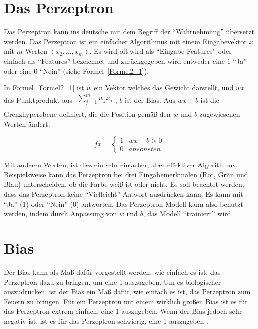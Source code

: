 \section{Das Perzeptron}
Das Perzeptron kann ins deutsche mit dem Begriff der \enquote{Wahrnehmung} übersetzt werden. Das Perzeptron ist ein einfacher Algorithmus mit einem Eingabevektor $x$ mit $m$ Werten $(x_2, ..., x_m)$. Es wird oft wird als \enquote{Eingabe-Features} oder einfach als \enquote{Features} bezeichnet und zurückgegeben wird entweder eine $1$ \enquote{Ja} oder eine $0$ \enquote{Nein} (siehe Formel~\ref{Formel2_1}).

In Formel~\ref{Formel2_1}  ist $w$ ein Vektor welches das Gewicht darstellt, und $wx$ das Punktprodukt aus $\begin{array}{l}
        {\textstyle \sum ^{m}_{j=1}} w_{j} x_{j} \\
    \end{array}$, $b$ ist der Bias.
Aus $wx + b$ ist die Grenzhyperebene definiert, die die Position gemäß den $w$ und $b$ zugewiesenen Werten ändert.

\begin{equation}
    fx=\begin{cases}
        1 & wx+b >0   \\
        0 & ansonsten
    \end{cases}
    \label{Formel2_1}
\end{equation}

Mit anderen Worten, ist dies ein sehr einfacher, aber effektiver Algorithmus. Beispielsweise kann das Perzeptron bei drei Eingabemerkmalen  (Rot, Grün und Blau) unterscheiden, ob die Farbe weiß ist oder nicht. Es soll beachtet werden, dass das Perzeptron keine \enquote{Vielleicht}-Antwort ausdrücken kann. Es kann mit \enquote{Ja} (1) oder \enquote{Nein} (0) antworten. Das Perzeptron-Modell kann also benutzt werden, indem durch Anpassung von $w$ und $b$, das Modell \enquote{trainiert} wird.

\section{Bias}
Der Bias kann als Maß dafür vorgestellt werden, wie einfach es ist, das Perzeptron dazu zu bringen, um eine 1 auszugeben. Um es biologischer auszudrücken, ist der Bias ein Maß dafür, wie einfach es ist, das Perzeptron zum Feuern zu bringen. Für ein Perzeptron mit einem wirklich großen Bias ist es für das Perzeptron extrem einfach, eine 1 auszugeben. Wenn der Bias jedoch sehr negativ ist, ist es für das Perzeptron schwierig, eine 1 auszugeben \cite*[7]{Nielsen2015}.

